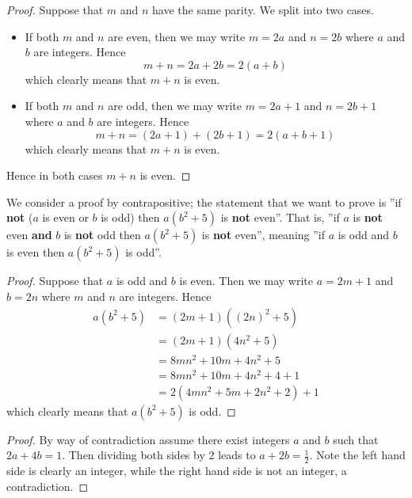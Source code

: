 \begin{questions}
    \item \begin{proof}
        Suppose that $m$ and $n$ have the same parity. We split into two cases.
        \begin{itemize}
            \item If both $m$ and $n$ are even, then we may write $m = 2a$ and $n = 2b$ where $a$ and $b$ are integers. Hence
            \[
                m + n = 2a + 2b = 2(a+b)        
            \]
            which clearly means that $m + n$ is even.
            \item If both $m$ and $n$ are odd, then we may write $m = 2a + 1$ and $n = 2b + 1$ where $a$ and $b$ are integers. Hence
            \[
                m + n = (2a + 1) + (2b + 1) = 2(a + b + 1)        
            \]
            which clearly means that $m+n$ is even.
        \end{itemize}
    Hence in both cases $m + n$ is even.
    \end{proof}
    
    \item We consider a proof by contrapositive; the statement that we want to prove is ''if \textbf{not} ($a$ is even or $b$ is odd) then $a(b^2+5)$ is \textbf{not} even''. That is, ''if $a$ is \textbf{not} even \textbf{and} $b$ is \textbf{not} odd then $a(b^2+5)$ is \textbf{not} even'', meaning ''if $a$ is odd and $b$ is even then $a(b^2+5)$ is odd''.
    
    \begin{proof}
        Suppose that $a$ is odd and $b$ is even. Then we may write $a = 2m + 1$ and $b = 2n$ where $m$ and $n$ are integers. Hence
    \begin{align*}
        a(b^2+5) &= (2m+1)\left((2n)^2 + 5\right)\\
        &= (2m+1)(4n^2 + 5)\\
        &= 8mn^2 + 10m + 4n^2 + 5\\
        &= 8mn^2 + 10m + 4n^2 + 4 + 1\\
        &= 2(4mn^2 + 5m + 2n^2 + 2) + 1
    \end{align*}
    which clearly means that $a(b^2+5)$ is odd.
    \end{proof}
    
    \item \begin{proof}
        By way of contradiction assume there exist integers $a$ and $b$ such that $2a + 4b = 1$. Then dividing both sides by 2 leads to $a + 2b = \frac12$. Note the left hand side is clearly an integer, while the right hand side is not an integer, a contradiction.    
    \end{proof}
    

\end{questions}
